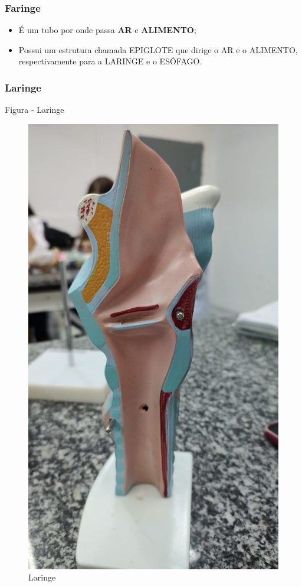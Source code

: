 \documentclass[
]{book}
\providecommand{\tightlist}{%
  \setlength{\itemsep}{0pt}\setlength{\parskip}{0pt}}
\begin{document}
\hypertarget{faringe}{%
\subsubsection{Faringe}\label{faringe}}

\begin{itemize}
\tightlist
\item
  É um tubo por onde passa \textbf{AR} e \textbf{ALIMENTO};
\item
  Possui um estrutura chamada EPIGLOTE que dirige o AR e o ALIMENTO, respectivamente para a LARINGE e o ESÔFAGO.
\end{itemize}

\hypertarget{laringe}{%
\subsubsection{Laringe}\label{laringe}}

Figura - Laringe

\begin{figure}

{\centering \includegraphics[width=0.9\linewidth]{figuras/Aula8-2-laringe} 

}

\caption{Laringe}\label{fig:unnamed-chunk-17}
\end{figure}
\end{document}
